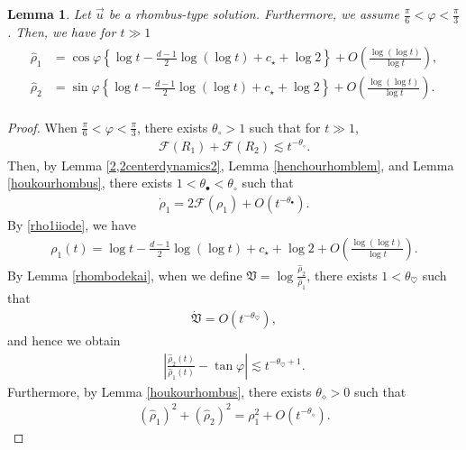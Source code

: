 \documentclass[10pt,a4paper]{amsart}
\newtheorem{lemma}[theorem]{Lemma}
\numberwithin{equation}{section}
\begin{document}
\begin{lemma}\label{hitantennagasaharplem}
Let $\vec{u}$ be a rhombus-type solution. Furthermore, we assume $\frac{\pi}{6}<\varphi<\frac{\pi}{3}$. Then, we have for $t\gg 1$
\begin{align}\label{hitantensharp}
\begin{aligned}
\hat{\rho}_1&=\cos{\varphi}\left\{\log{t}-\frac{d-1}{2}\log{(\log{t})}+c_{\star}+\log{2} \right\}+O\left(\frac{\log{(\log{t})}}{\log{t}}\right),
\\
\hat{\rho}_2&=\sin{\varphi}\left\{\log{t}-\frac{d-1}{2}\log{(\log{t})}+c_{\star}+\log{2} \right\}+O\left(\frac{\log{(\log{t})}}{\log{t}}\right).
\end{aligned}
\end{align}
\end{lemma}
\begin{proof}
When $\frac{\pi}{6}<\varphi<\frac{\pi}{3}$, there exists $\theta_{\circ}>1$ such that for $t\gg 1$,
\begin{align*}
\mathcal{F}(R_1)+\mathcal{F}(R_2)\lesssim t^{-\theta_{\circ}}.
\end{align*}
Then, by Lemma \ref{2,2centerdynamics2}, Lemma \ref{henchourhomblem}, and Lemma \ref{houkourhombus}, there exists $1<\theta_{\bullet}<\theta_{\circ}$ such that 
\begin{align}\label{rho1iiode}
\dot{\rho}_1=2\mathcal{F}(\rho_1)+O\left(t^{-\theta_{\bullet}}\right).
\end{align}
By \eqref{rho1iiode}, we have
\begin{align}\label{rho1nagasasharp}
\rho_1(t)=\log{t}-\frac{d-1}{2}\log{(\log{t})}+c_{\star}+\log{2}+O\left(\frac{\log{(\log{t})}}{\log{t}}\right).
\end{align}
By Lemma \ref{rhombodekai}, when we define $\mathfrak{V}=\log{\frac{\hat{\rho}_2}{\hat{\rho}_1}}$, there exists $1<\theta_{\heartsuit}$ such that 
\begin{align*}
\dot{\mathfrak{V}}=O\left(t^{-\theta_{\heartsuit}}\right),
\end{align*}
and hence we obtain
\begin{align}\label{kakudosharpconv}
\left|\frac{\hat{\rho}_2(t)}{\hat{\rho}_1(t)}-\tan{\varphi}\right|\lesssim t^{-\theta_{\heartsuit}+1}.
\end{align}
Furthermore, by Lemma \ref{houkourhombus}, there exists $\theta_{\diamond}>0$ such that 
\begin{align}\label{rhokeies1}
\left(\hat{\rho}_1\right)^2+\left(\hat{\rho}_2\right)^2=\rho_1^2+O\left(t^{-\theta_{\diamond}}\right).

\end{align}
\end{proof}
\end{document}
